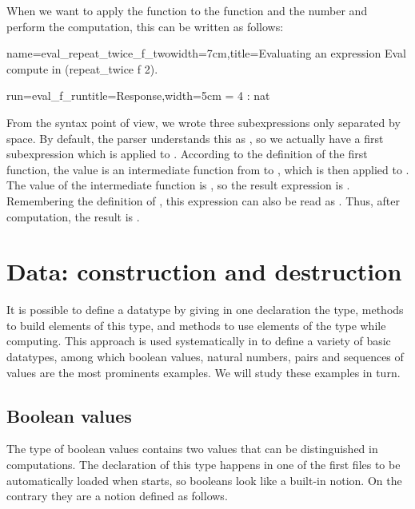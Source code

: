 When we want to apply the function  to the function
 and the number  and perform the computation, this can be
written as follows:

\begin{coq}{name=eval_repeat_twice_f_two}{width=7cm,title=Evaluating
    an expression}
Eval compute in (repeat_twice f 2).
\end{coq}
\begin{coqout}{run=eval_f_run}{title=Response,width=5cm}
  = 4 : nat
\end{coqout}
From the syntax point of view, we wrote three subexpressions only
separated by space.  By default, the parser understands this as
, so we actually have a first subexpression
which is  applied to .  According to the
definition of the first function, the value is an intermediate
function from 
to , which is then applied to .  The value of the
intermediate function is , so the result
expression is .
Remembering the definition of , this expression can also
be read as .  Thus, after computation, the result is .

\section{Data: construction and destruction}
It is possible to define a datatype by giving in one declaration
the type, methods to build elements of this type, and methods to
use elements of the type while computing.  This approach is used
systematically in \Coq{} to define a variety of basic datatypes, among
which boolean values, natural numbers, pairs and sequences of values
are the most prominents examples.  We will study these examples in
turn.
\subsection{Boolean values}
The type  of boolean values contains two values that can be
distinguished in computations.  The declaration of this type happens
in one of the first files to be automatically loaded when \Coq{} starts,
so booleans look like a built-in notion.  On the contrary they are a
notion defined as follows.

